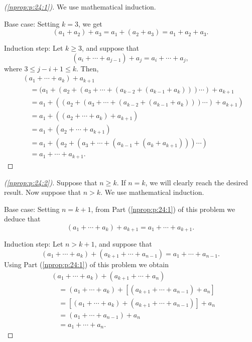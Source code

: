\begin{proof}[(\ref{nprop:p:24:1})]
	We use mathematical induction.

	Base case: Setting $k = 3$, we get
	$$
		(a_1 + a_2) + a_3 = a_1 + (a_2 + a_3) = a_1 + a_2 + a_3.
	$$

	Induction step: Let $k \geq 3$, and suppose that
	$$
		(a_i + \cdots + a_{j - 1}) + a_j = a_i + \cdots + a_j,
	$$
	where $3 \leq j - i + 1 \leq k$. Then,
	\begin{align*}
		 & (a_1 + \cdots + a_k) + a_{k + 1}                                                             \\
		 & \quad = (a_1 + (a_2 + (a_3 + \cdots + (a_{k - 2} + (a_{k - 1} + a_k))) \cdots ) + a_{k + 1}  \\
		 & \quad = a_1 + ((a_2 + (a_3 + \cdots + (a_{k - 2} + (a_{k - 1} + a_k))) \cdots ) + a_{k + 1}) \\
		 & \quad = a_1 + ((a_2 + \cdots + a_k) + a_{k + 1})                                             \\
		 & \quad = a_1 + (a_2 + \cdots + a_{k + 1})                                                     \\
		 & \quad = a_1 + (a_2 + (a_3 + \cdots + (a_{k - 1} + (a_k + a_{k + 1}))) \cdots )               \\
		 & \quad = a_1 + \cdots + a_{k + 1}.
	\end{align*}
\end{proof}

\begin{proof}[(\ref{nprop:p:24:2})]
	Suppose that $n \geq k$. If $n = k$, we will clearly reach the desired result. Now suppose that $n > k$. We use mathematical induction.

	Base case: Setting $n = k + 1$, from Part (\ref{nprop:p:24:1}) of this problem we deduce that
	$$
		(a_1 + \cdots + a_k) + a_{k + 1} = a_1 + \cdots + a_{k + 1}.
	$$

	Induction step: Let $n > k + 1$, and suppose that
	$$
		(a_1 + \cdots + a_k) + (a_{k + 1} + \cdots + a_{n - 1}) = a_1 + \cdots + a_{n - 1}.
	$$
	Using Part (\ref{nprop:p:24:1}) of this problem we obtain
	\begin{align*}
		 & (a_1 + \cdots + a_k) + (a_{k + 1} + \cdots + a_n)                                    \\
		 & \quad = (a_1 + \cdots + a_k) + \left[ (a_{k + 1} + \cdots + a_{n - 1}) + a_n \right] \\
		 & \quad = \left[ (a_1 + \cdots + a_k) + (a_{k + 1} + \cdots + a_{n - 1}) \right] + a_n \\
		 & \quad = (a_1 + \cdots + a_{n - 1}) + a_n                                             \\
		 & \quad = a_1 + \cdots + a_n.
	\end{align*}
\end{proof}

